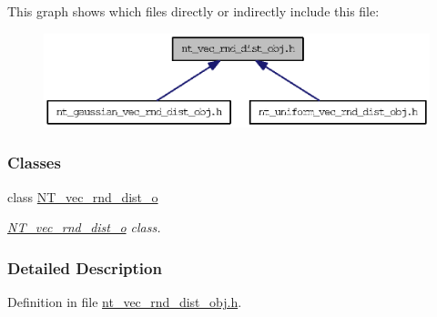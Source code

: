 This graph shows which files directly or indirectly include this file:
\nopagebreak
\begin{figure}[H]
\begin{center}
\leavevmode
\includegraphics[width=392pt]{nt__vec__rnd__dist__obj_8h__dep__incl}
\end{center}
\end{figure}
\subsubsection*{Classes}
\begin{DoxyCompactItemize}
\item 
class \hyperlink{class_n_t__vec__rnd__dist__o}{NT\_\-vec\_\-rnd\_\-dist\_\-o}
\begin{DoxyCompactList}\small\item\em \hyperlink{class_n_t__vec__rnd__dist__o}{NT\_\-vec\_\-rnd\_\-dist\_\-o} class. \item\end{DoxyCompactList}\end{DoxyCompactItemize}


\subsubsection{Detailed Description}


Definition in file \hyperlink{nt__vec__rnd__dist__obj_8h_source}{nt\_\-vec\_\-rnd\_\-dist\_\-obj.h}.

